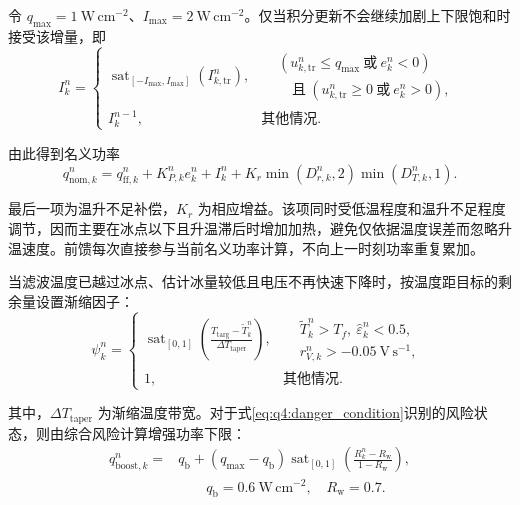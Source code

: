 令 $q_{\max}=1\ \mathrm{W\,cm^{-2}}$、$I_{\max}=2\ \mathrm{W\,cm^{-2}}$。仅当积分更新不会继续加剧上下限饱和时接受该增量，即
\begin{equation}
I_k^n=\begin{cases}
\operatorname{sat}_{[-I_{\max},I_{\max}]}(I_{k,\mathrm{tr}}^n),
& \begin{aligned}
&(u_{k,\mathrm{tr}}^n\leq q_{\max}\ \text{或}\ e_k^n<0)\\[-2pt]
&\quad\text{且}\ (u_{k,\mathrm{tr}}^n\geq0\ \text{或}\ e_k^n>0),
\end{aligned}\\
I_k^{n-1}, & \text{其他情况}.
\end{cases}
\tag{7-22}\label{eq:q4:antiwindup}
\end{equation}

由此得到名义功率
\begin{equation}
q_{\mathrm{nom},k}^n=q_{\mathrm{ff},k}^n+K_{P,k}^ne_k^n+I_k^n
+K_r\min(D_{r,k}^n,2)\min(D_{T,k}^n,1).
\tag{7-23}\label{eq:q4:nominal_power}
\end{equation}

最后一项为温升不足补偿，$K_r$ 为相应增益。该项同时受低温程度和温升不足程度调节，因而主要在冰点以下且升温滞后时增加加热，避免仅依据温度误差而忽略升温速度。前馈每次直接参与当前名义功率计算，不向上一时刻功率重复累加。

当滤波温度已越过冰点、估计冰量较低且电压不再快速下降时，按温度距目标的剩余量设置渐缩因子：
\begin{equation}
\psi_k^n=\begin{cases}
\displaystyle\operatorname{sat}_{[0,1]}\!\left(
\frac{T_{\mathrm{targ}}-\widetilde T_k^n}{\Delta T_{\mathrm{taper}}}\right),
&\begin{aligned}
&\widetilde T_k^n>T_f,\ \widehat\varepsilon_k^n<0.5,\\[-2pt]
&r_{V,k}^n>-0.05\ \mathrm{V\,s^{-1}},
\end{aligned}\\
1, &\text{其他情况}.
\end{cases}
\tag{7-24}\label{eq:q4:taper_factor}
\end{equation}

其中，$\Delta T_{\mathrm{taper}}$ 为渐缩温度带宽。对于式\eqref{eq:q4:danger_condition}识别的风险状态，则由综合风险计算增强功率下限：
\begin{equation}
\begin{aligned}
q_{\mathrm{boost},k}^n={}&q_{\mathrm b}
+(q_{\max}-q_{\mathrm b})\operatorname{sat}_{[0,1]}\!\left(
\frac{R_k^n-R_{\mathrm w}}{1-R_{\mathrm w}}\right),
\\
&\qquad q_{\mathrm b}=0.6\ \mathrm{W\,cm^{-2}},\quad R_{\mathrm w}=0.7.
\end{aligned}
\tag{7-25}\label{eq:q4:safety_boost}
\end{equation}

